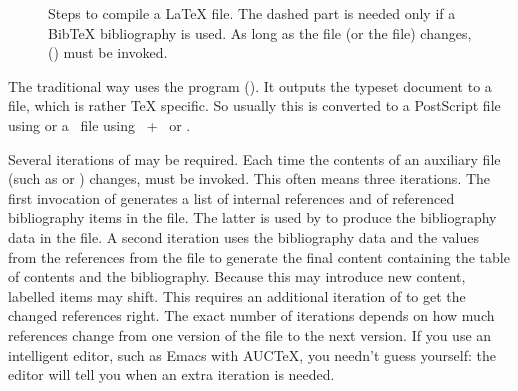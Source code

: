 \begin{figure}
\medskip
  \par\medskip
  \caption[Steps to compile a LaTeX file]{Steps to compile a LaTeX file.
    The dashed part is needed only if a BibTeX bibliography is used.
    As long as the  file (or the  file) changes,
    () must be invoked.}\label{fig:compile}
\end{figure}
The traditional way uses the  program (). It
outputs the typeset document to a  file, which is rather TeX
specific. So usually this is converted to a PostScript file using
 or a \PDF\ file using ~+~ or
.

Several iterations of  may be required. Each time the contents
of an auxiliary file (such as  or ) changes,
 must be invoked. This often means three iterations. The first
invocation of  generates a list of internal references and of
referenced bibliography items in the  file. The latter is used
by  to produce the bibliography data in the  file.
A second iteration uses the bibliography data and the values from the
references from the  file to generate the final content
containing the table of contents and the bibliography. Because this may
introduce new content, labelled items may shift. This requires an additional
iteration of  to get the changed references right. The exact
number  of iterations depends on how much references change from one
version of the  file to the next version. If you use an
intelligent editor, such as Emacs with AUCTeX, you needn't guess
yourself: the editor will tell you when an extra iteration is needed.

